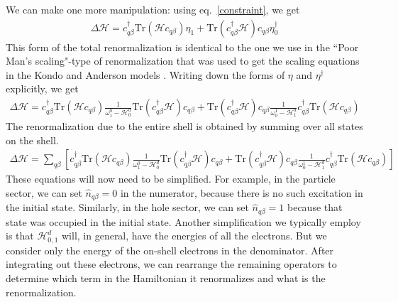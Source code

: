 We can make one more manipulation: using eq.~\ref{constraint}, we get
\begin{equation}\begin{aligned}
	\Delta \mathcal{H} = c_{q\beta}^\dagger \text{Tr}\left(\mathcal{H} c_{q\beta}\right)\eta_1 + \text{Tr}\left(c_{q\beta}^\dagger \mathcal{H}\right) c_{q\beta}\eta^\dagger_0 
\end{aligned}\end{equation}
This form of the total renormalization is identical to the one we use in the ``Poor Man's scaling"-type of renormalization that was used to get the scaling equations in the Kondo and Anderson models \cite{anderson1970,haldane1978scaling}. Writing down the forms of \(\eta\) and \(\eta^\dagger\) explicitly, we get
\begin{equation}\begin{aligned}
	\Delta \mathcal{H} = c_{q\beta}^\dagger \text{Tr}\left(\mathcal{H} c_{q\beta}\right)\frac{1}{\omega_1^0 - \mathcal{H}^d_0} \text{Tr}\left(c_{q\beta}^\dagger\mathcal{H}\right) c_{q\beta}+ \text{Tr}\left(c_{q\beta}^\dagger \mathcal{H}\right) c_{q\beta} \frac{1}{\omega_0^1 - \mathcal{H}^d_1}c_{q\beta}^\dagger\text{Tr}\left(\mathcal{H} c_{q\beta}\right)
\end{aligned}\end{equation}
The renormalization due to the entire shell is obtained by summing over all states on the shell.
\begin{equation}\begin{aligned}
	\label{delta}
	\Delta \mathcal{H} = \sum_{q\beta}\left[c_{q\beta}^\dagger \text{Tr}\left(\mathcal{H} c_{q\beta}\right)\frac{1}{\omega_1^0 - \mathcal{H}^d_0} \text{Tr}\left(c_{q\beta}^\dagger\mathcal{H}\right) c_{q\beta} + \text{Tr}\left(c_{q\beta}^\dagger \mathcal{H}\right) c_{q\beta}\frac{1}{\omega_0^1 - \mathcal{H}^d_1}c_{q\beta}^\dagger\text{Tr}\left(\mathcal{H} c_{q\beta}\right)\right] 
\end{aligned}\end{equation}
These equations will now need to be simplified. For example, in the particle sector, we can set \(\hat n_{q\beta}=0\) in the numerator, because there is no such excitation in the initial state. Similarly, in  the hole sector, we can set \(\hat n_{q\beta}=1\) because that state was occupied in the initial state. Another simplification we typically employ is that \(\mathcal{H}^d_{0,1}\) will, in general, have the energies of all the electrons. But we consider only the energy of the on-shell electrons in the denominator. After integrating out these electrons, we can rearrange the remaining operators to determine which term in the Hamiltonian it renormalizes and what is the renormalization.

